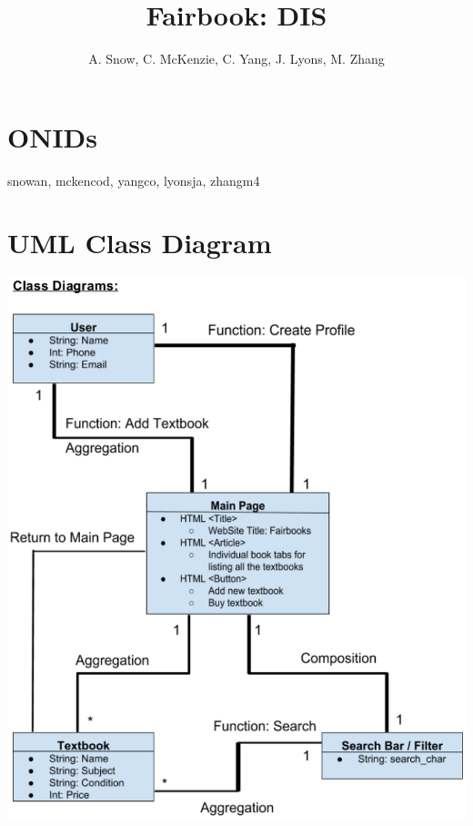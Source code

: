 \documentclass[12pt]{article}
\title{Fairbook: DIS}
\author{A. Snow, C. McKenzie, C. Yang, J. Lyons, M. Zhang}
\begin{document}
	\maketitle


	\tableofcontents
	\section{ONIDs}
		snowan, mckencod, yangco, lyonsja, zhangm4



	\section{UML Class Diagram}
	\includegraphics[width=16cm]{uml_class_diagram.ps}
\end{document}

